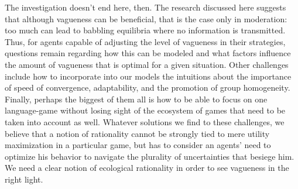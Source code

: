 \documentclass[a4paper]{article}
\begin{document}
The investigation doesn't end here, then.
The research discussed here suggests that although vagueness can be beneficial, that is the case only in moderation: too much can lead to babbling equilibria where no information is transmitted.
Thus, for agents capable of adjusting the level of vagueness in their strategies, questions remain regarding how this can be modeled and what factors influence the amount of vagueness that is optimal for a given situation.
Other challenges include how to incorporate into our models the intuitions about the importance of speed of convergence, adaptability, and the promotion of group homogeneity.
Finally, perhaps the biggest of them all is how to be able to focus on one language-game without losing sight of the ecosystem of games that need to be taken into account as well.
Whatever solutions we find to these challenges, we believe that a notion of rationality cannot be strongly tied to mere utility maximization in a particular game, but has to consider an agents' need to optimize his behavior to navigate the plurality of uncertainties that besiege him.
We need a clear notion of ecological rationality in order to see vagueness in the right light.


\printbibliography
\end{document}

